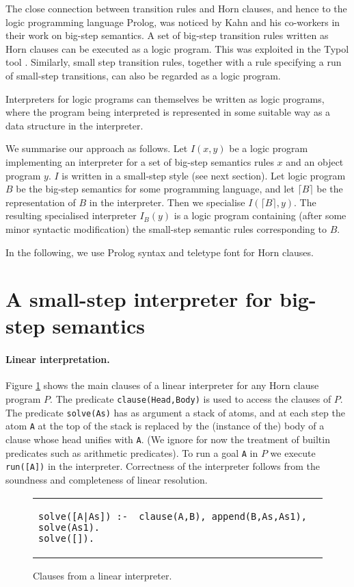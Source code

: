 \documentclass{llncs}
\begin{document}
The close connection between transition rules and Horn clauses, and hence to the logic programming language Prolog, 
was noticed by Kahn and his co-workers in their work on big-step semantics.
A set of big-step transition rules written as Horn clauses can be executed as a logic program. This was exploited in
the Typol tool \cite{Typol}. Similarly, small step transition rules, together with a rule specifying a run of
small-step transitions, can also be regarded as a logic program.

Interpreters for logic programs can themselves be written as logic programs, where the program being interpreted 
is represented in some suitable way as a data structure in the interpreter.  

We summarise our approach as follows.  Let $I(x,y)$ be a logic program implementing an interpreter for a set of
big-step semantics rules $x$ and an object program $y$. $I$ is written in a small-step style (see next section).  Let logic program $B$ be the big-step semantics
for some programming language, and let $\lceil B \rceil$ be the representation of $B$ in the interpreter.  Then we specialise 
$I(\lceil B \rceil,y)$.  The resulting specialised interpreter $I_B(y)$ is a logic program containing (after some minor syntactic modification) 
the small-step semantic rules
corresponding to $B$.

In the following, we use Prolog syntax and teletype font for Horn clauses.

\section{A small-step interpreter for big-step semantics}\label{small-step-interp}

\paragraph{Linear interpretation.}  Figure \ref{fig:linear-interp} shows the main clauses of a linear interpreter for any Horn clause program $P$.  
The predicate \texttt{clause(Head,Body)} is used to access the clauses of $P$.  The predicate \texttt{solve(As)} has as argument a stack of atoms, and
at each step the atom  \texttt{A} at the top of the stack is replaced by the (instance of the) body of a clause whose head unifies with \texttt{A}.
(We ignore for now the treatment of builtin predicates such as arithmetic predicates).
To run a goal \texttt{A} in $P$ we execute \texttt{run([A])} in the interpreter.  
Correctness of the interpreter follows from the soundness and completeness of linear resolution.
\begin{figure}
\begin{tabular}{l}
\begin{lstlisting}
solve([A|As]) :-  clause(A,B), append(B,As,As1), solve(As1).
solve([]).
\end{lstlisting}
\end{tabular}
\caption{Clauses from a linear interpreter.}\label{fig:linear-interp}
\end{figure}
\end{document}
